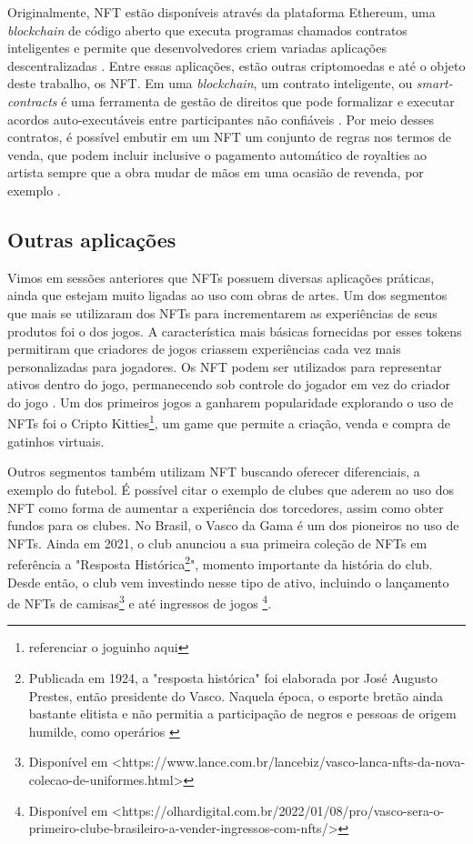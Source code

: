 Originalmente, NFT estão disponíveis através da plataforma Ethereum, uma \textit{blockchain} de código aberto que executa programas chamados contratos inteligentes e permite que desenvolvedores criem variadas aplicações descentralizadas \cite{Antonopoulos}. Entre essas aplicações, estão outras criptomoedas e até o objeto deste trabalho, os NFT. Em uma \textit{blockchain}, um contrato inteligente, ou \textit{smart-contracts} é uma ferramenta de gestão de direitos que pode formalizar e executar acordos auto-executáveis entre participantes não confiáveis \cite{Voshmgir}. Por meio desses contratos, é possível embutir em um NFT um conjunto de regras nos termos de venda, que podem incluir inclusive o pagamento automático de royalties ao artista sempre que a obra mudar de mãos em uma ocasião de revenda, por exemplo \cite{Kugler}.

\subsection{Outras aplicações}
\label{subsec: outras aplicações}

Vimos em sessões anteriores que NFTs possuem diversas aplicações práticas, ainda que estejam muito ligadas ao uso com obras de artes. Um dos segmentos que mais se utilizaram dos NFTs para incrementarem as experiências de seus produtos foi o dos jogos. A característica mais básicas fornecidas por esses tokens permitiram que criadores de jogos criassem experiências cada vez mais personalizadas para jogadores. Os NFT podem ser utilizados para representar ativos dentro do jogo, permanecendo sob controle do jogador em vez do criador do jogo \cite{Voshmgir}. Um dos primeiros jogos a ganharem popularidade explorando o uso de NFTs foi o Cripto Kitties\footnote{referenciar o joguinho aqui}, um game que permite a criação, venda e compra de gatinhos virtuais. 

Outros segmentos também utilizam NFT buscando oferecer diferenciais, a exemplo do futebol. É possível citar o exemplo de clubes que aderem ao uso dos NFT como forma de aumentar a experiência dos torcedores, assim como obter fundos para os clubes. No Brasil, o Vasco da Gama é um dos pioneiros no uso de NFTs. Ainda em 2021, o club anunciou a sua primeira coleção de NFTs em referência a "Resposta Histórica\footnote{Publicada em 1924, a "resposta histórica" foi elaborada por José Augusto Prestes, então presidente do Vasco. Naquela época, o esporte bretão ainda bastante elitista e não permitia a participação de negros e pessoas de origem humilde, como operários \cite{Resposta}}", momento importante da história do club. Desde então, o club vem investindo nesse tipo de ativo, incluindo o lançamento de NFTs de camisas\footnote{Disponível em <https://www.lance.com.br/lancebiz/vasco-lanca-nfts-da-nova-colecao-de-uniformes.html>} e até ingressos de jogos \footnote{Disponível em <https://olhardigital.com.br/2022/01/08/pro/vasco-sera-o-primeiro-clube-brasileiro-a-vender-ingressos-com-nfts/>}. 



